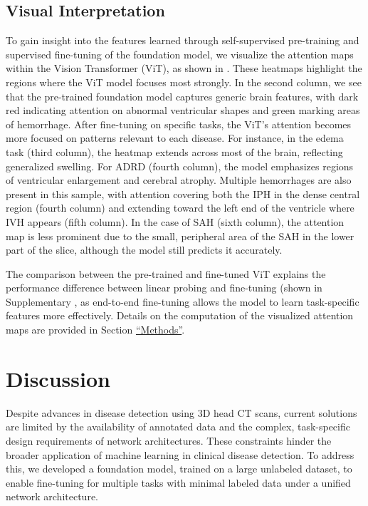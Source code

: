 \documentclass[fleqn,10pt]{wlscirep}
\begin{document}
\subsection*{Visual Interpretation}
To gain insight into the features learned through self-supervised pre-training and supervised fine-tuning of the foundation model, we visualize the attention maps within the Vision Transformer (ViT), as shown in . These heatmaps highlight the regions where the ViT model focuses most strongly. In the second column, we see that the pre-trained foundation model captures generic brain features, with dark red indicating attention on abnormal ventricular shapes and green marking areas of hemorrhage. After fine-tuning on specific tasks, the ViT’s attention becomes more focused on patterns relevant to each disease. For instance, in the edema task (third column), the heatmap extends across most of the brain, reflecting generalized swelling. For ADRD (fourth column), the model emphasizes regions of ventricular enlargement and cerebral atrophy. Multiple hemorrhages are also present in this sample, with attention covering both the IPH in the dense central region (fourth column) and extending toward the left end of the ventricle where IVH appears (fifth column). In the case of SAH (sixth column), the attention map is less prominent due to the small, peripheral area of the SAH in the lower part of the slice, although the model still predicts it accurately.

The comparison between the pre-trained and fine-tuned ViT explains the performance difference between linear probing and fine-tuning (shown in Supplementary , as end-to-end fine-tuning allows the model to learn task-specific features more effectively. Details on the computation of the visualized attention maps are provided in Section \hyperref[sec:methods]{“Methods”}.



\section*{Discussion}
Despite advances in disease detection using 3D head CT scans, current solutions are limited by the availability of annotated data and the complex, task-specific design requirements of network architectures. These constraints hinder the broader application of machine learning in clinical disease detection. To address this, we developed a foundation model, trained on a large unlabeled dataset, to enable fine-tuning for multiple tasks with minimal labeled data under a unified network architecture. 
\end{document}
